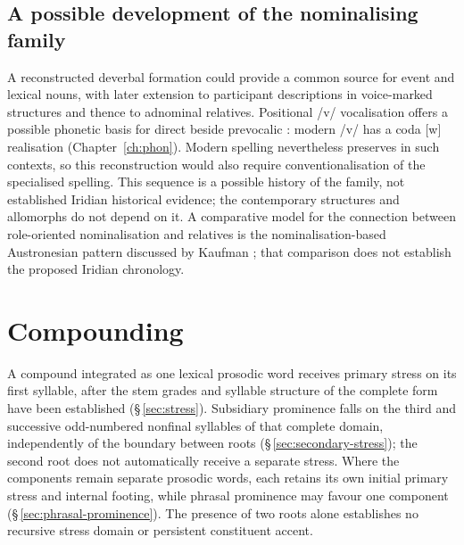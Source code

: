 \subsection{A possible development of the nominalising family}
\label{sec:nm-derived-history}

A reconstructed deverbal  formation could provide a common source
for event and lexical nouns, with later extension to participant descriptions
in voice-marked structures and thence to adnominal relatives. Positional /v/
vocalisation offers a possible phonetic basis for direct  beside
prevocalic : modern /v/ has a coda [w] realisation
(Chapter~\ref{ch:phon}). Modern spelling nevertheless preserves 
in such contexts, so this reconstruction would also require conventionalisation
of the specialised  spelling. This sequence is a possible history of the family,
not established Iridian historical evidence; the contemporary structures and
allomorphs do not depend on it. A comparative model for the connection between
role-oriented nominalisation and relatives is the nominalisation-based
Austronesian pattern discussed by Kaufman \cite[§3.4]{kaufman2026}; that
comparison does not establish the proposed Iridian chronology.

\FloatBarrier

\section{Compounding}\label{sec:compound-prosody}

A compound integrated as one lexical prosodic word receives primary stress on
its first syllable, after the stem grades and syllable structure of the complete
form have been established (§\,\ref{sec:stress}). Subsidiary prominence
falls on the third and successive odd-numbered nonfinal syllables of that
complete domain, independently of the boundary between roots
(§\,\ref{sec:secondary-stress}); the second root does not automatically
receive a separate stress. Where the components remain separate prosodic
words, each retains its own initial primary stress and internal footing,
while phrasal prominence may favour one component
(§\,\ref{sec:phrasal-prominence}). The presence of two roots alone
establishes no recursive stress domain or persistent constituent accent.
